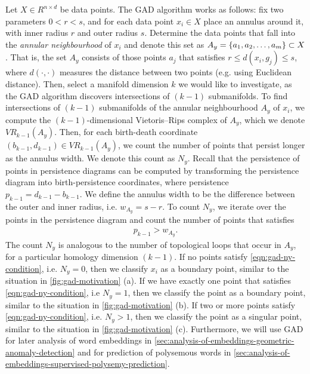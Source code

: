 Let $X \in R^{n \times d}$ be data points. The GAD algorithm works as follows: fix two parameters $0 < r < s$, and for each data point $x_i \in X$ place an annulus around it, with inner radius $r$ and outer radius $s$. Determine the data points that fall into the \textit{annular neighbourhood} of $x_i$ and denote this set as $A_y = \left\{a_1, a_2, \ldots, a_m\right\} \subset X$. That is, the set $A_y$ consists of those points $a_j$ that satisfies $r \leq d(x_i, g_j) \leq s$, where $d(\cdot, \cdot)$ measures the distance between two points (e.g. using Euclidean distance). Then, select a manifold dimension $k$ we would like to investigate, as the GAD algorithm discovers intersections of $(k-1)$ submanifolds. To find intersections of $(k-1)$ submanifolds of the annular neighbourhood $A_y$ of $x_i$, we compute the $(k-1)$-dimensional Vietoris–Rips complex of $A_y$, which we denote $VR_{k-1}(A_y)$. Then, for each birth-death coordinate $(b_{k-1}, d_{k-1}) \in VR_{k-1}(A_y)$, we count the number of points that persist longer as the annulus width. We denote this count as $N_y$. Recall that the persistence of points in persistence diagrams can be computed by transforming the persistence diagram into birth-persistence coordinates, where persistence $p_{k-1} = d_{k-1} - b_{k-1}$. We define the annulus width to be the difference between the outer and inner radius, i.e. $w_{A_y} = s - r$. To count $N_y$, we iterate over the points in the persistence diagram and count the number of points that satisfies
\begin{align}
    p_{k-1} > w_{A_y}.
    \label{eqn:gad-ny-condition}
\end{align}
The count $N_y$ is analogous to the number of topological loops that occur in $A_y$, for a particular homology dimension $(k-1)$. If no points satisfy \cref{eqn:gad-ny-condition}, i.e. $N_y=0$, then we classify $x_i$ as a boundary point, similar to the situation in \cref{fig:gad-motivation} (a). If we have exactly one point that satisfies \cref{eqn:gad-ny-condition}, i.e $N_y=1$, then we classify the point as a boundary point, similar to the situation in \cref{fig:gad-motivation} (b). If two or more points satisfy \cref{eqn:gad-ny-condition}, i.e. $N_y>1$, then we classify the point as a singular point, similar to the situation in \cref{fig:gad-motivation} (c). Furthermore, we will use GAD for later analysis of word embeddings in \cref{sec:analysis-of-embeddings-geometric-anomaly-detection} and for prediction of polysemous words in \cref{sec:analysis-of-embeddings-supervised-polysemy-prediction}. 